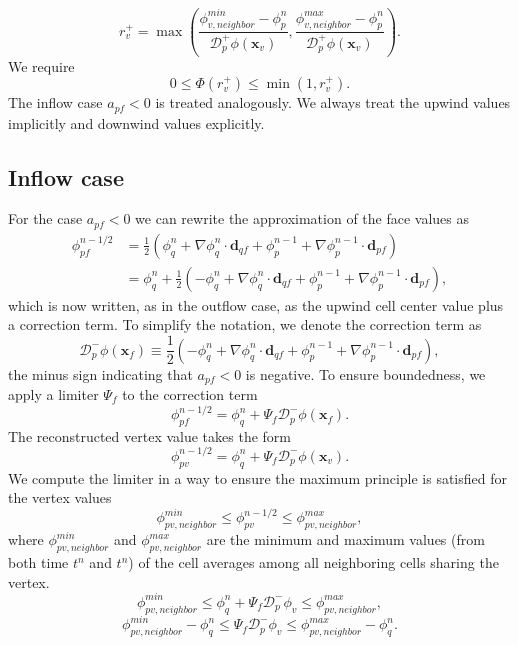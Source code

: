 \documentclass{article}
\begin{document}
\[
	r_{v}^+ =
	\max \left(
		\frac{\phi_{v, neighbor}^{min} -\phi_p^n}{\mathcal{D}^+_p\phi (\boldsymbol{x}_{v})},
		 \frac{\phi_{v, neighbor}^{max} -\phi_p^n}{\mathcal{D}^+_p\phi (\boldsymbol{x}_{v})}
		 \right).
\]
We require
\[
	0 \leq \Phi(r_{v}^+) \leq \min(1, r_{v}^+).
\]
The inflow case $ a_{pf} < 0 $ is treated analogously.
We always treat the upwind values implicitly and downwind values explicitly.
\newpage
\subsection{Inflow case}
For the case $ a_{pf} < 0 $ we can rewrite the approximation of the face values as
\begin{equation}
	\begin{split}
		\phi_{pf}^{n-1/2}
		&= \frac{1}{2}(\phi_q^{n} + \nabla\phi_q^{n}\cdot\boldsymbol{d}_{qf} +
		\phi_p^{n-1} + \nabla\phi_p^{n-1}\cdot\boldsymbol{d}_{pf}) \\
		&= \phi_q^{n} + \frac{1}{2}(-\phi_q^{n} + \nabla\phi_q^{n}\cdot\boldsymbol{d}_{qf} +
		\phi_p^{n-1} + \nabla\phi_p^{n-1}\cdot\boldsymbol{d}_{pf}),
	\end{split}
\end{equation}
which is now written, as in the outflow case,
as the upwind cell center value plus a correction term.
To simplify the notation, we denote the correction term as
\[
	\mathcal{D}_{p}^-\phi(\boldsymbol{x}_f)
	\equiv
	\frac{1}{2}(-\phi_q^{n} + \nabla\phi_q^{n}\cdot\boldsymbol{d}_{qf} +
	\phi_p^{n-1} + \nabla\phi_p^{n-1}\cdot\boldsymbol{d}_{pf}),
\]
the minus sign indicating that $ a_{pf} < 0 $ is negative.
To ensure boundedness, we apply a limiter $ \Psi_{f} $ to the correction term
\begin{equation}
	\phi_{pf}^{n-1/2} =
	\phi_q^{n} + \Psi_{f}\mathcal{D}_{p}^-\phi(\boldsymbol{x}_f).
\end{equation}
The reconstructed vertex value takes the form
\[
	\phi_{pv}^{n-1/2} =
	\phi_q^{n} + \Psi_{f}\mathcal{D}_{p}^-\phi(\boldsymbol{x}_{v}).
\]
We compute the limiter in a way to ensure the maximum principle is satisfied for the vertex values
\[
	\phi_{pv, neighbor}^{min}
	\leq
	\phi_{pv}^{n-1/2}
	\leq
	\phi_{pv, neighbor}^{max},
\]
where $ \phi_{pv, neighbor}^{min} $ and $ \phi_{pv, neighbor}^{max} $
are the minimum and maximum values (from both time $ t^n $ and $ t^n $)
of the cell averages among all neighboring cells sharing the vertex.
\[
	\phi_{pv, neighbor}^{min}
	\leq
	\phi_q^{n} + \Psi_{f}\mathcal{D}_{p}^-\phi_{v}
	\leq
	\phi_{pv, neighbor}^{max},
\]
\[
	\phi_{pv, neighbor}^{min} -\phi_q^{n}
	\leq
	\Psi_{f}\mathcal{D}_{p}^-\phi_{v}
	\leq
	\phi_{pv, neighbor}^{max} -\phi_q^{n}.
\]
\end{document}

